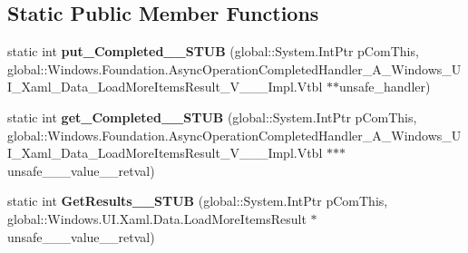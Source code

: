 \subsection*{Static Public Member Functions}
\begin{DoxyCompactItemize}
\item 
\mbox{\label{struct_windows_1_1_foundation_1_1_i_async_operation___a___windows___u_i___xaml___data___load_mor4757a93b106839c8518b7060ad515b5e_a8b85c3856664b162b19f59bbc3eb9290}} 
static int {\bfseries put\+\_\+\+Completed\+\_\+\+\_\+\+S\+T\+UB} (global\+::\+System.\+Int\+Ptr p\+Com\+This, global\+::\+Windows.\+Foundation.\+Async\+Operation\+Completed\+Handler\+\_\+\+A\+\_\+\+Windows\+\_\+\+U\+I\+\_\+\+Xaml\+\_\+\+Data\+\_\+\+Load\+More\+Items\+Result\+\_\+\+V\+\_\+\+\_\+\+\_\+\+Impl.\+Vtbl $\ast$$\ast$unsafe\+\_\+handler)
\item 
\mbox{\label{struct_windows_1_1_foundation_1_1_i_async_operation___a___windows___u_i___xaml___data___load_mor4757a93b106839c8518b7060ad515b5e_a471e76cd0c4cdcbcdfb3254bba41c7b6}} 
static int {\bfseries get\+\_\+\+Completed\+\_\+\+\_\+\+S\+T\+UB} (global\+::\+System.\+Int\+Ptr p\+Com\+This, global\+::\+Windows.\+Foundation.\+Async\+Operation\+Completed\+Handler\+\_\+\+A\+\_\+\+Windows\+\_\+\+U\+I\+\_\+\+Xaml\+\_\+\+Data\+\_\+\+Load\+More\+Items\+Result\+\_\+\+V\+\_\+\+\_\+\+\_\+\+Impl.\+Vtbl $\ast$$\ast$$\ast$unsafe\+\_\+\+\_\+\+\_\+value\+\_\+\+\_\+retval)
\item 
\mbox{\label{struct_windows_1_1_foundation_1_1_i_async_operation___a___windows___u_i___xaml___data___load_mor4757a93b106839c8518b7060ad515b5e_aeff4a35de12fc3007a84cc50f4124ea3}} 
static int {\bfseries Get\+Results\+\_\+\+\_\+\+S\+T\+UB} (global\+::\+System.\+Int\+Ptr p\+Com\+This, global\+::\+Windows.\+U\+I.\+Xaml.\+Data.\+Load\+More\+Items\+Result $\ast$unsafe\+\_\+\+\_\+\+\_\+value\+\_\+\+\_\+retval)
\item 
\mbox{\label{struct_windows_1_1_foundation_1_1_i_async_operation___a___windows___u_i___xaml___data___load_mor4757a93b106839c8518b7060ad515b5e_a8b85c3856664b162b19f59bbc3eb9290}} 
$$
\end{DoxyCompactItemize}
